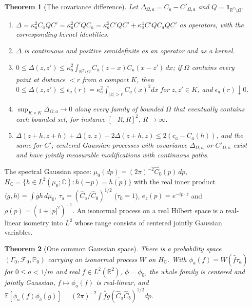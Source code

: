 \documentclass[11pt]{article}
\theoremstyle{plain}
\newtheorem{theorem}{Theorem}[section]
\theoremstyle{definition}
\theoremstyle{remark}
\newcommand{\R}{\mathbb{R}}
\newcommand{\C}{\mathbb{C}}
\newcommand{\E}{\mathbb{E}}
\newcommand{\PP}{\mathbb{P}}
\newcommand{\cF}{\mathcal{F}}
\newcommand{\ind}{\mathbf{1}}
\newcommand{\conj}[1]{\overline{#1}}
\begin{document}
\begin{theorem}[The covariance difference]\label{thm:G-diff}
Let $\Delta_{\Omega,a}=C_a-C'_{\Omega,a}$ and $Q=\ind_{\R^{2}\setminus\Omega}$.
\begin{enumerate}[label=(\alph*)]
\item $\Delta=\kappa_a^{2}C_aQC'=\kappa_a^{2}C'QC_a=\kappa_a^{2}C'QC'+\kappa_a^{4}C'QC_aQC'$ as
  operators, with the corresponding kernel identities.
\item $\Delta$ is continuous and positive semidefinite as an operator and as a
  kernel.
\item $0\le\Delta(z,z')\le\kappa_a^{2}\int_{\R^{2}\setminus\Omega}C_a(z-x)C_a(x-z')\,dx$; if $\Omega$
  contains every point at distance $<r$ from a compact $K$, then
  $0\le\Delta(z,z')\le\epsilon_a(r)=\kappa_a^{2}\int_{|x|>r}C_a(x)^{2}dx$ for $z,z'\in K$, and
  $\epsilon_a(r)\downarrow0$.
\item $\sup_{K\times K}\Delta_{\Omega,a}\to0$ along every family of bounded $\Omega$ that
  eventually contains each bounded set, for instance $[-R,R]^{2}$, $R\to\infty$.
\item $\Delta(z+h,z+h)+\Delta(z,z)-2\Delta(z+h,z)\le2(c_a-C_a(h))$, and the same for $C'$;
  centered Gaussian processes with covariance $\Delta_{\Omega,a}$ or $C'_{\Omega,a}$ exist and
  have jointly measurable modifications with continuous paths.
\end{enumerate}
\end{theorem}

The spectral Gaussian space: $\mu_0(dp)=(2\pi)^{-2}\hat C_0(p)\,dp$,
$H_{\C}=\{h\in L^{2}(\mu_0;\C):h(-p)=\conj{h(p)}\}$ with the real inner product
$\langle g,h\rangle=\int\conj gh\,d\mu_0$, $\tau_a=(\hat C_a/\hat C_0)^{1/2}$ ($\tau_0=1$),
$e_z(p)=e^{-ip\cdot z}$ and $\rho(p)=(1+|p|^{2})^{-1}$. An isonormal process on a real
Hilbert space is a real-linear isometry into $L^{2}$ whose range consists of
centered jointly Gaussian variables.

\begin{theorem}[One common Gaussian space]\label{thm:G-common}
There is a probability space $(\Gamma_0,\cF_0,\PP_0)$ carrying an isonormal process
$W$ on $H_{\C}$. With $\phi_a(f)=W(\hat f\tau_a)$ for $0\le a<1/m$ and real
$f\in L^{2}(\R^{2})$, $\phi=\phi_0$, the whole family is centered and jointly Gaussian,
$f\mapsto\phi_a(f)$ is real-linear, and
$\E[\phi_a(f)\phi_b(g)]=(2\pi)^{-2}\int\conj{\hat f}\hat g(\hat C_a\hat C_b)^{1/2}dp$.
\end{theorem}
\end{document}
